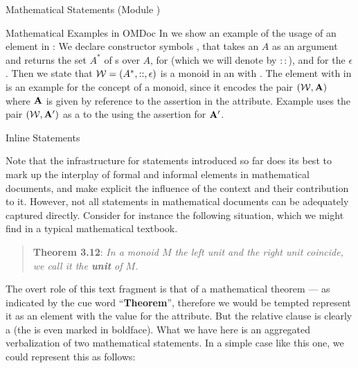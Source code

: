 \begin{tchapter}[id=statements,short=Mathematical Statements]{Mathematical Statements (Module {})}
\begin{tsection}[id=examples]{Mathematical Examples in OMDoc}
In {} we show an example of the usage of an {} element
in {\omdoc}: We declare constructor symbols {}, that takes an
{} $A$ as an argument and returns the set $A^*$ of
{s} over $A$, {} for {}
(which we will denote by $::$), and {} for the
{} $\epsilon$.  Then we state that ${\cal W}=(A^*,::,\epsilon)$ is a
monoid in an {} with {}.  The
{} element with {} in {} is
an example for the concept of a monoid, since it encodes the pair $({\cal W},{\bf A})$ where ${\bf A}$
is given by reference to the assertion {} in the
{} attribute.  Example {} uses the pair
$({\cal W},{\bf A}')$ as a {} to the {}
{} using the assertion {} for
${\bf A}'$.
\end{tsection}

\begin{tsection}[id=inline-statements]{Inline Statements}

  Note that the infrastructure for statements introduced so far does its best to mark up
  the interplay of formal and informal elements in mathematical documents, and make
  explicit the influence of the context and their contribution to it. However, not all
  statements in mathematical documents can be adequately captured directly.  Consider for
  instance the following situation, which we might find in a typical mathematical
  textbook.
\begin{quote}
  {\bf{Theorem 3.12}}: {\emph{In a monoid $M$ the left unit and the right unit coincide,
      we call it the {\bf{unit}} of $M$.}}
\end{quote}
The overt role of this text fragment is that of a mathematical theorem --- as indicated by
the cue word ``{\bf{Theorem}}'', therefore we would be tempted represent it as an
{} element with the value {} for the
{} attribute. But the relative clause is clearly a
{} (the {} is even marked in boldface). What we
have here is an aggregated verbalization of two mathematical statements. In a simple case
like this one, we could represent this as follows:


\end{tsection}
\end{tchapter}
